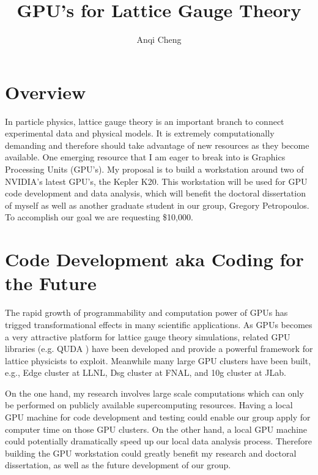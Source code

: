 \documentclass[11pt]{article}
\begin{document}
  \title{GPU's for Lattice Gauge Theory}
  \author{Anqi Cheng}
  \maketitle

  \section*{Overview} %
  In particle physics, lattice gauge theory is an important branch to connect experimental data and physical models.
  It is extremely computationally demanding and therefore should take advantage of new  resources as they become available.
  One emerging resource that I am eager to break into is Graphics Processing Units (GPU's).   
  My proposal is to build a workstation around two of NVIDIA's latest GPU's, the Kepler K20.  
  This workstation will be used for GPU code development and data analysis, which will benefit the doctoral dissertation of myself as well as another 
  graduate student in our group, Gregory Petropoulos. 
  To accomplish our goal we are requesting \$10,000.  
  
  \section*{Code Development aka Coding for the Future} %
  The rapid growth of programmability and computation power of GPUs has trigged transformational effects in many scientific applications. 
  As GPUs becomes a very attractive platform for lattice gauge theory simulations, related GPU libraries (e.g. QUDA \cite{QUDA1,QUDA2,QUDA3}) have been developed and provide a powerful framework for lattice physicists to exploit.
  Meanwhile many large GPU clusters have been built, e.g., Edge cluster at LLNL, Dsg cluster at FNAL, and 10g cluster at JLab.

  On the one hand, my research involves large scale computations which can only be performed on publicly available supercomputing resources. 
  Having a local GPU machine for code development and testing could enable our group apply for computer time on those GPU clusters.
  On the other hand, a local GPU machine could potentially dramatically speed up our local data analysis process.
  Therefore building the GPU workstation could greatly benefit my research and doctoral dissertation, as well as the future development of our group.
 
\end{document}
